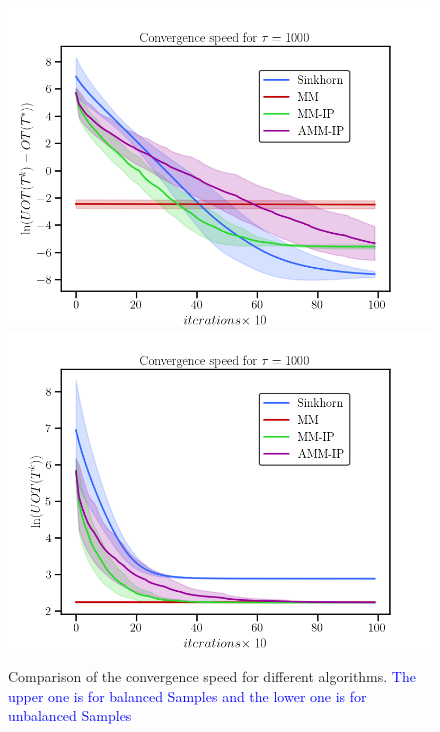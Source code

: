 \documentclass[a4paper,twocolumn]{article}
\newcommand{\changeSX}[1]{\textcolor{blue}{#1}}
\begin{document}
\begin{figure}[htbp]
\centering
\includegraphics[width = 0.99\linewidth]{pic/ex1}
\centering
\includegraphics[width = 0.99\linewidth]{pic/ex3}
\caption{Comparison of the convergence speed for different algorithms. \changeSX{The upper one is for balanced Samples and the lower one is for unbalanced Samples}}
\label{Fig:ex1}
\end{figure}
\end{document}
